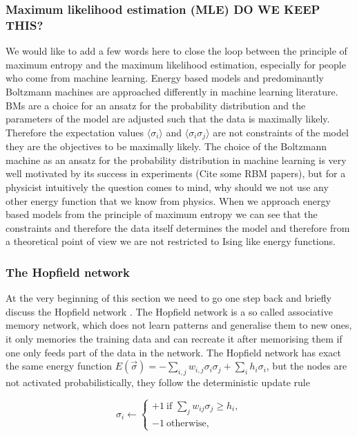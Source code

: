 \documentclass[nofootinbib, superscriptaddress, prl]{revtex4}
\begin{document}
\subsubsection{Maximum likelihood estimation (MLE) DO WE KEEP THIS?}

We would like to add a few words here to close the loop between the principle of maximum entropy and the maximum likelihood estimation, especially for people who come from machine learning.
Energy based models and predominantly Boltzmann machines are approached differently in machine learning literature. BMs are a choice for an ansatz for the probability distribution and the parameters of the model are adjusted such that the data is maximally likely. Therefore the expectation values $\langle \sigma_i \rangle$ and  $\langle \sigma_i \sigma_j \rangle$ are not constraints of the model they are the objectives to be maximally likely.
The choice of the Boltzmann machine as an ansatz for the probability distribution in machine learning is very well motivated by its success in experiments (Cite some RBM papers), but for a physicist intuitively the question comes to mind, why should we not use any other energy function that we know from physics. When we approach energy based models from the principle of maximum entropy we can see that the constraints and therefore the data itself determines the model and therefore from a theoretical point of view we are not restricted to Ising like energy functions.

\subsubsection{The Hopfield network}

At the very beginning of this section we need to go one step back and briefly discuss the Hopfield network \cite{Hopfield1982NeuralNA}. The Hopfield network is a so called associative memory network, which does not learn patterns and generalise them to new ones, it only memories the training data and can recreate it after memorising them if one only feeds part of the data in the network. The Hopfield network has exact the same energy function $E(\vec {\sigma}) = -\sum_{i,j} w_{i,j} \sigma_i \sigma_j + \sum_i h_i \sigma_i$, but the nodes are not activated probabilistically, they follow the deterministic update rule

\begin{equation}
\label{Eq:Hopfield update}
	\sigma_{i}\leftarrow \left\{{\begin{array}{ll}+1~{\mbox{if }}\sum _{{j}}{w_{{ij}}\sigma_{j}}\geq h _{i},\\-1~{\mbox{otherwise,}}\end{array}}\right.
\end{equation}
\end{document}
